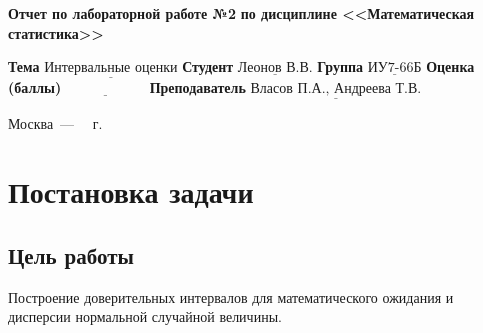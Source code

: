 \documentclass[12pt]{report}
\begin{document}
\begin{titlepage}
		\begin{center}
			\noindent\begin{minipage}{1.1\textwidth}\centering
				\Large\textbf{Отчет по лабораторной работе №2}\newline
				\textbf{по дисциплине <<Математическая статистика>>}\newline
			\end{minipage}
		\end{center}
		
		\noindent\textbf{Тема} $\underline{\text{Интервальные оценки}}$\newline\newline
		\noindent\textbf{Студент} $\underline{\text{Леонов В.В.}}$\newline\newline
		\noindent\textbf{Группа} $\underline{\text{ИУ7-66Б}}$\newline\newline
		\noindent\textbf{Оценка (баллы)} $\underline{\text{~~~~~~~~~~~~~~~~~}}$\newline\newline
		\noindent\textbf{Преподаватель} $\underline{\text{Власов П.А., Андреева Т.В.}}$\newline\newline\newline
		
		\begin{center}
			\vfill
			Москва~---~\the\year
			~г.
		\end{center}
	\end{titlepage}
	
\chapter*{Постановка задачи}



\section*{Цель работы}

Построение доверительных интервалов для математического ожидания и дисперсии нормальной случайной величины.
\end{document}
